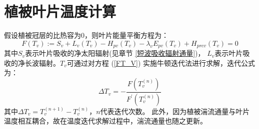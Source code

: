\chapter{植被叶片温度计算}\label{植被叶片温度计算}

假设植被冠层的比热容为0，则叶片能量平衡方程为：
\begin{equation}\label{FT_V}
F\left(T_{v}\right):=S_{v}+L_{v}\left(T_{v}\right)-H_{p v}\left(T_{v}\right)-\lambda_{v} E_{p v}\left(T_{v}\right)+H_{p r c v}\left(T_{v}\right)=0
\end{equation}
其中$S_v$表示叶片吸收的净太阳辐射(见章节 \ref{短波吸收辐射通量})，
$L_v$表示叶片吸收的净长波辐射。$T_v$可通过对方程 (\ref{FT_V}) 实施牛顿迭代法进行求解，迭代公式为：
\begin{equation}
\Delta T_{v}=-\frac{F\left(T_{v}^{(n)}\right)}{F^{\prime}\left(T_{v}^{(n)}\right)}
\end{equation}
其中$\Delta T_v=T_v^{\left(n+1\right)}-T_v^{\left(n\right)}$，$n$代表迭代次数。
此外，因为植被湍流通量与叶片温度相互耦合，故在温度迭代求解过程中，湍流通量也随之更新。


